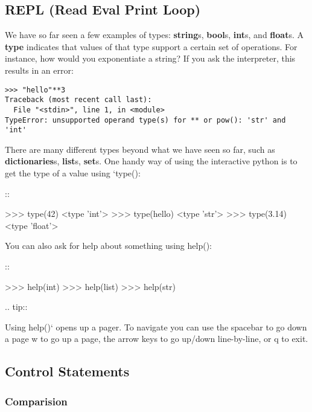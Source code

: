 \subsection{REPL (Read Eval Print
Loop)}\label{repl-read-eval-print-loop}

We have so far seen a few examples of types: \textbf{string}s,
\textbf{bool}s, \textbf{int}s, and \textbf{float}s. A \textbf{type}
indicates that values of that type support a certain set of operations.
For instance, how would you exponentiate a string? If you ask the
interpreter, this results in an error:

\begin{verbatim}
>>> "hello"**3
Traceback (most recent call last):
  File "<stdin>", line 1, in <module>
TypeError: unsupported operand type(s) for ** or pow(): 'str' and 'int'
\end{verbatim}

There are many different types beyond what we have seen so far, such as
\textbf{dictionaries}s, \textbf{list}s, \textbf{set}s. One handy way of
using the interactive python is to get the type of a value using
`type():

::

   \textgreater{}\textgreater{}\textgreater{} type(42)
   \textless{}type 'int'\textgreater{}
   \textgreater{}\textgreater{}\textgreater{} type(hello)
   \textless{}type 'str'\textgreater{}
   \textgreater{}\textgreater{}\textgreater{} type(3.14)
   \textless{}type 'float'\textgreater{}

You can also ask for help about something using help():

::

   \textgreater{}\textgreater{}\textgreater{} help(int)
   \textgreater{}\textgreater{}\textgreater{} help(list)
   \textgreater{}\textgreater{}\textgreater{} help(str)

.. tip::

   Using help()` opens up a pager. To navigate you can use the spacebar
to go down a page w to go up a page, the arrow keys to go up/down
line-by-line, or q to exit.

\subsection{Control Statements}\label{control-statements}

\subsubsection{Comparision}\label{comparision}

